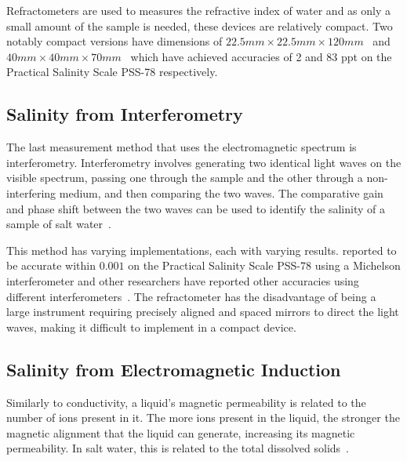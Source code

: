 Refractometers are used to measures the refractive index of water and as only a small amount of the sample is needed, these devices are relatively compact.
Two notably compact versions have dimensions of $22.5mm \times 22.5mm \times 120mm$~\cite{malarde_compact_refractometer_2008} and $40mm \times 40mm \times 70mm$~\cite{tengesdal_compact_refractometer_2012} which have achieved accuracies of 2 and 83 \gls{ppt} on the Practical Salinity Scale PSS-78 respectively.

\subsection{Salinity from Interferometry}

The last measurement method that uses the electromagnetic spectrum is interferometry.
Interferometry involves generating two identical light waves on the visible spectrum, passing one through the sample and the other through a non-interfering medium, and then comparing the two waves.
The comparative gain and phase shift between the two waves can be used to identify the salinity of a sample of salt water~\cite{liao_interferometer_seawater_salinity_2023}.

This method has varying implementations, each with varying results.
 reported to be accurate within $0.001$ on the Practical Salinity Scale PSS-78 using a Michelson interferometer and other researchers have reported other accuracies using different interferometers~\cite{possetti_interferometer_salinity_measurement_2009, nguyen_interferometer_salinity_measurement_2009, zhao_interferometer_salinity_measurement_2009}.
The refractometer has the disadvantage of being a large instrument requiring precisely aligned and spaced mirrors to direct the light waves, making it difficult to implement in a compact device. 

\subsection{Salinity from Electromagnetic Induction}\label{subsec:salinity-from-electromagnetic-induction}

Similarly to conductivity, a liquid's magnetic permeability is related to the number of ions present in it.
The more ions present in the liquid, the stronger the magnetic alignment that the liquid can generate, increasing its magnetic permeability.
In salt water, this is related to the total dissolved solids~\cite{somaraju_electromagnetic_salinity_2006}.

